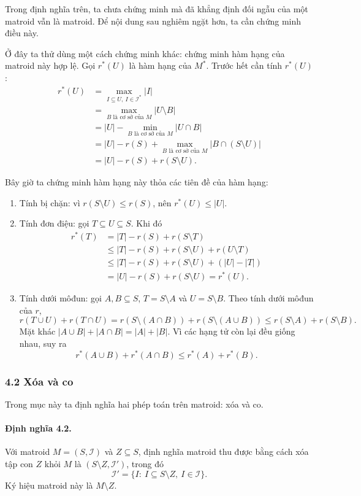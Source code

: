 \documentclass[11pt]{article}
\begin{document}
Trong định nghĩa trên, ta chưa chứng minh mà đã khẳng định đối ngẫu của một
matroid vẫn là matroid. Để nội dung sau nghiêm ngặt hơn, ta cần chứng minh điều
này.

Ở đây ta thử dùng một cách chứng minh khác: chứng minh hàm hạng của matroid này
hợp lệ. Gọi \(r^*(U)\) là hàm hạng của \(M^*\). Trước hết cần tính \(r^*(U)\):
\[
\begin{aligned}
r^*(U)
  &= \max_{I\subseteq U,\ I\in\mathcal I^*} |I| \\
  &= \max_{B\text{ là cơ sở của }M} |U\setminus B| \\
  &= |U|-\min_{B\text{ là cơ sở của }M}|U\cap B| \\
  &= |U|-r(S)+\max_{B\text{ là cơ sở của }M}|B\cap(S\setminus U)| \\
  &= |U|-r(S)+r(S\setminus U).
\end{aligned}
\]

Bây giờ ta chứng minh hàm hạng này thỏa các tiên đề của hàm hạng:
\begin{enumerate}
  \item Tính bị chặn: vì \(r(S\setminus U)\le r(S)\), nên \(r^*(U)\le |U|\).
  \item Tính đơn điệu: gọi \(T\subseteq U\subseteq S\). Khi đó
  \[
  \begin{aligned}
  r^*(T)
    &= |T|-r(S)+r(S\setminus T)\\
    &\le |T|-r(S)+r(S\setminus U)+r(U\setminus T)\\
    &\le |T|-r(S)+r(S\setminus U)+(|U|-|T|)\\
    &= |U|-r(S)+r(S\setminus U)=r^*(U).
  \end{aligned}
  \]
  \item Tính dưới môđun: gọi \(A,B\subseteq S\), \(T=S\setminus A\) và
  \(U=S\setminus B\). Theo tính dưới môđun của \(r\),
  \[
    r(T\cup U)+r(T\cap U)
    =r(S\setminus(A\cap B))+r(S\setminus(A\cup B))
    \le r(S\setminus A)+r(S\setminus B).
  \]
  Mặt khác \(|A\cup B|+|A\cap B|=|A|+|B|\). Vì các hạng tử còn lại đều giống
  nhau, suy ra
  \[
    r^*(A\cup B)+r^*(A\cap B)\le r^*(A)+r^*(B).
  \]
\end{enumerate}

\subsubsection*{4.2 Xóa và co}

Trong mục này ta định nghĩa hai phép toán trên matroid: xóa và co.

\paragraph{Định nghĩa 4.2.}
Với matroid \(M=(S,\mathcal I)\) và \(Z\subseteq S\), định nghĩa matroid thu
được bằng cách xóa tập con \(Z\) khỏi \(M\) là \((S\setminus Z,\mathcal I')\),
trong đó
\[
  \mathcal I'=\{I:\ I\subseteq S\setminus Z,\ I\in\mathcal I\}.
\]
Ký hiệu matroid này là \(M\setminus Z\).
\end{document}
